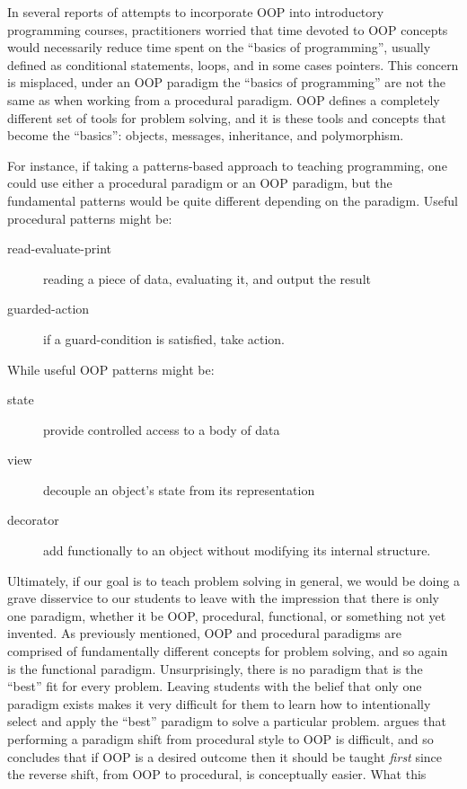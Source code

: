 \documentclass[12pt]{article}
\begin{document}

In several reports of attempts to incorporate OOP into introductory
programming courses, practitioners worried that time devoted to OOP
concepts would necessarily reduce time spent on the ``basics of
programming'', usually defined as conditional statements, loops, and
in some cases pointers. This concern is misplaced, under an OOP
paradigm the ``basics of programming'' are not the same as when
working from a procedural paradigm. OOP defines a completely different
set of tools for problem solving, and it is these tools and concepts
that become the ``basics'': objects, messages, inheritance, and
polymorphism\autocite{kolling_problem_1999,kay_history_1996}.

For instance, if taking a patterns-based approach to teaching
programming, one could use either a procedural paradigm or an OOP
paradigm, but the fundamental patterns would be quite different
depending on the paradigm\autocite{wallingford_first_1996}. Useful
procedural patterns might be:

\begin{description}
\item[read-evaluate-print] reading a piece of data, evaluating it, and output the result
\item[guarded-action] if a guard-condition is satisfied, take action.
\end{description}

While useful OOP patterns might be:

\begin{description}
\item[state]  provide controlled access to a body of data
\item[view] decouple an object's state from its representation
\item[decorator] add functionally to an object without modifying its internal structure.
\end{description}

Ultimately, if our goal is to teach problem solving in general, we
would be doing a grave disservice to our students to leave with the
impression that there is only one paradigm, whether it be OOP,
procedural, functional, or something not yet invented. As previously
mentioned, OOP and procedural paradigms are comprised of fundamentally
different concepts for problem solving, and so again is the functional
paradigm. Unsurprisingly, there is no paradigm that is the ``best''
fit for every problem. Leaving students with the belief that only one
paradigm exists makes it very difficult for them to learn how to
intentionally select and apply the ``best'' paradigm to solve a
particular problem. \citeauthor{kolling_problem_1999} argues that
performing a paradigm shift from procedural style to OOP is difficult,
and so concludes that if OOP is a desired outcome then it should be
taught \emph{first} since the reverse shift, from OOP to procedural,
is conceptually easier. What this 
\end{document}
